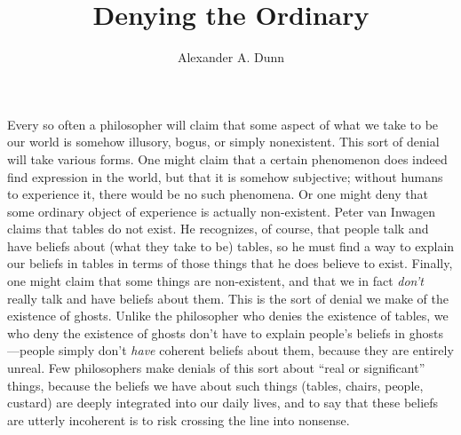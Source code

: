 \documentclass[11pt]{article}
\title{Denying the Ordinary}
\author{Alexander A. Dunn}
\newenvironment{inq}{\vspace{0pt}%
	\begin{list}{}%
	{\setlength\labelwidth{0pt}%
	\setlength\leftmargin{2.5\oddsidemargin}%
	\setlength\rightmargin{\leftmargin}}
	\begin{spacing}{1}
	\item[]%
	}{
	\end{spacing}
	\end{list}
	\vspace{10pt}
	}
\begin{document}
\ifstandalone
\maketitle
\begin{spacing}{1.5}
\fi



\noindent Every so often a philosopher will claim that some aspect of what we take to be our world is somehow illusory, bogus, or simply nonexistent. This sort of denial will take various forms. One might claim that a certain phenomenon does indeed find expression in the world, but that it is somehow subjective; without humans to experience it, there would be no such phenomena. Or one might deny that some ordinary object of experience is actually non-existent. Peter van Inwagen claims that tables do not exist. He recognizes, of course, that people talk and have beliefs about (what they take to be) tables, so he must find a way to explain our beliefs in tables in terms of those things that he does believe to exist. Finally, one might claim that some things are non-existent, and that we in fact {\em don't} really talk and have beliefs about them. This is the sort of denial we make of the existence of ghosts. Unlike the philosopher who denies the existence of tables, we who deny the existence of ghosts don't have to explain people's beliefs in ghosts---people simply don't {\em have} coherent beliefs about them, because they are entirely unreal. Few philosophers make denials of this sort about ``real or significant'' things, because the beliefs we have about such things (tables, chairs, people, custard) are deeply integrated into our daily lives, and to say that these beliefs are utterly incoherent is to risk crossing the line into nonsense.


\end{spacing}
\end{document}
